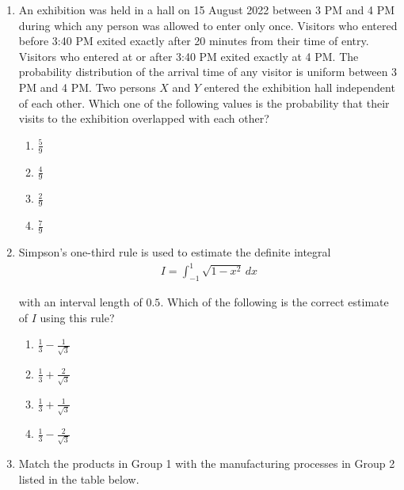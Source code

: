 \documentclass[journal,12pt,onecolumn]{IEEEtran}
\theoremstyle{remark}
\begin{document}
\begin{enumerate}
    \hfill{}
    \item An exhibition was held in a hall on 15 August 2022 between 3 PM and 4 PM during
    which any person was allowed to enter only once. Visitors who entered before 3:40 PM exited exactly after 20 minutes from their time of entry.
    Visitors who entered at or after 3:40 PM exited exactly at 4 PM. The probability distribution of the arrival time of any visitor is uniform between 3 PM and 4 PM. Two persons $X$ and $Y$ entered the exhibition hall independent of each other. Which one of the following values is the probability that their visits to the exhibition overlapped with each other?

    \hfill{}
    \begin{enumerate}
        \item $\frac{5}{9}$
        \item $\frac{4}{9}$
        \item $\frac{2}{9}$
        \item $\frac{7}{9}$
    \end{enumerate}
    
    \item Simpson’s one-third rule is used to estimate the definite integral
    \begin{align*}
        I = \int_{-1}^{1} \sqrt{1-x^2} \, dx
    \end{align*}
    
    with an interval length of $0.5$. Which of the following is the correct estimate of $I$ using this rule?
    
    \hfill{}
    \begin{enumerate}
        \item $\frac{1}{3} - \frac{1}{\sqrt{3}}$
        \item $\frac{1}{3} + \frac{2}{\sqrt{3}}$
        \item $\frac{1}{3} + \frac{1}{\sqrt{3}}$
        \item $\frac{1}{3} - \frac{2}{\sqrt{3}}$
    \end{enumerate}

    \item Match the products in Group 1 with the manufacturing processes in Group 2 listed in the table below.


\end{enumerate}
\end{document}
